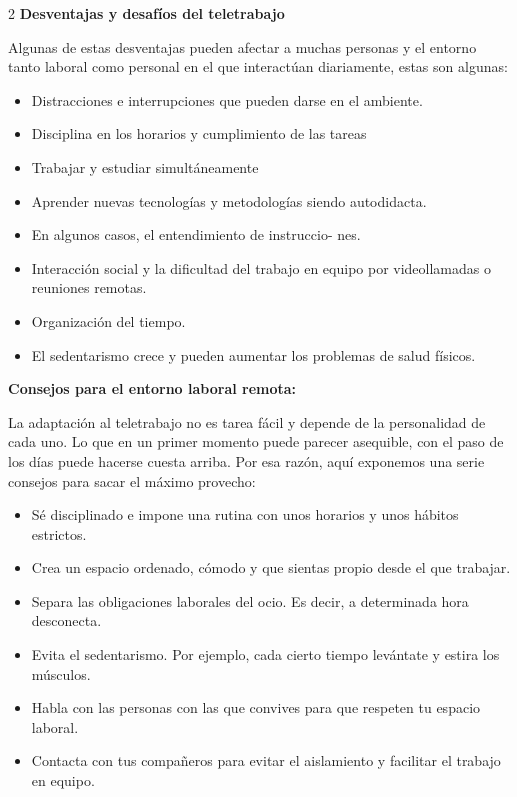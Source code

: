 \documentclass[12pt,spanish,Letterpaper,openany]{book}
\providecommand{\tightlist}{%
  \setlength{\itemsep}{0pt}\setlength{\parskip}{0pt}}
\begin{document}
\begin {multicols}{2}
\textbf{Desventajas y desafíos del teletrabajo}

Algunas de estas desventajas pueden afectar a muchas personas y el entorno tanto laboral como personal en el que interactúan diariamente, estas son algunas:

\begin{itemize}
\tightlist
\item
  Distracciones e interrupciones que pueden darse en el ambiente.
\item
  Disciplina en los horarios y cumplimiento de las tareas
\item
  Trabajar y estudiar simultáneamente
\item
  Aprender nuevas tecnologías y metodologías siendo autodidacta.
\item
  En algunos casos, el entendimiento de instruccio-
  nes.
\item
  Interacción social y la dificultad del trabajo en equipo por videollamadas o reuniones remotas.
\item
  Organización del tiempo.
\item
  El sedentarismo crece y pueden aumentar los problemas de salud físicos.
\end{itemize}

\textbf{Consejos para el entorno laboral remota:}

La adaptación al teletrabajo no es tarea fácil y depende de la personalidad de cada uno. Lo que en un primer momento puede parecer asequible, con el paso de los días puede hacerse cuesta arriba. Por esa razón, aquí exponemos una serie consejos para sacar el máximo provecho:

\begin{itemize}
\tightlist
\item
  Sé disciplinado e impone una rutina con unos horarios y unos hábitos estrictos.
\item
  Crea un espacio ordenado, cómodo y que sientas propio desde el que trabajar.
\item
  Separa las obligaciones laborales del ocio. Es decir, a determinada hora desconecta.
\item
  Evita el sedentarismo. Por ejemplo, cada cierto tiempo levántate y estira los músculos.
\item
  Habla con las personas con las que convives para que respeten tu espacio laboral.
\item
  Contacta con tus compañeros para evitar el aislamiento y facilitar el trabajo en equipo.
\end{itemize}


\end{multicols}
\end{document}
